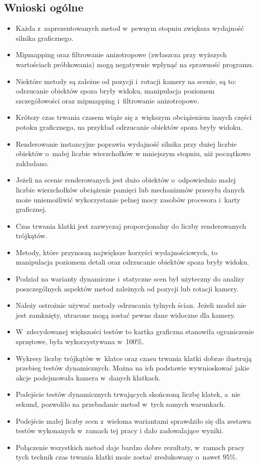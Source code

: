 \documentclass[a4paper,twoside,12pt]{book}
\begin{document}
\subsection{Wnioski ogólne}
\begin{itemize}
    \item Każda z~zaprezentowanych metod w~pewnym stopniu zwiększa wydajność silnika graficznego.
    \item Mipmapping oraz filtrowanie anizotropowe (zwłaszcza przy wyższych wartościach próbkowania) mogą negatywnie wpłynąć na sprawność programu.
    \item Niektóre metody są zależne od pozycji i~rotacji kamery na scenie, są to: odrzucanie obiektów spoza bryły widoku, manipulacja poziomem szczegółowości oraz mipmapping i~filtrowanie anizotropowe.
    \item Krótszy czas trwania czasem wiąże się z~większym obciążeniem innych części potoku graficznego, na przykład odrzucanie obiektów spoza bryły widoku.
    \item Renderowanie instancyjne poprawia wydajność silnika przy dużej liczbie obiektów o~małej liczbie wierzchołków w mniejszym stopniu, niż początkowo zakładano.
    \item Jeżeli na scenie renderowanych jest dużo obiektów o~odpowiednio małej liczbie wierzchołków obciążenie pamięci lub mechanizmów przesyłu danych może uniemożliwić wykorzystanie pełnej mocy zasobów procesora i~karty graficznej.
    \item Czas trwania klatki jest zazwyczaj proporcjonalny do liczby renderowanych trójkątów.
    \item Metody, które przynoszą największe korzyści wydajnościowych, to manipulacja poziomem detali oraz odrzucanie obiektów spoza bryły widoku.
    \item Podział na warianty dynamiczne i~statyczne scen był użyteczny do analizy poszczególnych aspektów metod zależnych od pozycji lub rotacji kamery.
    \item Należy ostrożnie używać metody odrzucania tylnych ścian. Jeżeli model nie jest zamknięty, utracone mogą zostać pewne dane widoczne dla kamery.
    \item W~zdecydowanej większości testów to kartka graficzna stanowiła ograniczenie sprzętowe, była wykorzystywana w~100\%.
    \item Wykresy liczby trójkątów w~klatce oraz czasu trwania klatki dobrze ilustrują przebieg testów dynamicznych. Można na ich podstawie wywnioskować jakie akcje podejmowała kamera w~danych klatkach.
    \item Podejście testów dynamicznych trwających skończoną liczbę klatek, a~nie sekund, pozwoliło na przebadanie metod w~tych samych warunkach.
    \item Podejście małej liczby scen z~wieloma wariantami sprawdziło się dla zestawu testów wykonanych w~ramach tej pracy i dało zadowalające wyniki.
    \item Połączenie wszystkich metod daje bardzo dobre rezultaty, w~ramach pracy tych technik czas trwania klatki może zostać zredukowany o~nawet 95\%.
\end{itemize}
\end{document}
